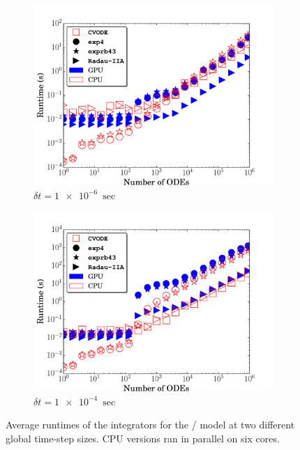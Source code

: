 \documentclass[final,twocolumn]{elsarticle}
\begin{document}
\begin{figure}[htb]
  \ifmeasure
  \fontsize{8pt}{10pt}\selectfont
  \fi
  \centering
  \begin{subfigure}{0.49\textwidth}
      \includegraphics[width=\linewidth]{H2_1e-06_cpuvsgpu.pdf}
      \caption{$\delta t = \SI{1e-6}{\sec}$}   
  \end{subfigure}
  \begin{subfigure}{0.49\textwidth}
      \includegraphics[width=\linewidth]{H2_1e-04_cpuvsgpu.pdf}
      \caption{$\delta t = \SI{1e-4}{\sec}$}
  \end{subfigure}
  \caption{Average runtimes of the integrators for the \slash{} model at two different global time-step sizes. 
  CPU versions ran in parallel on six cores.}
  \label{F:H2_perf}
\end{figure}
\end{document}
